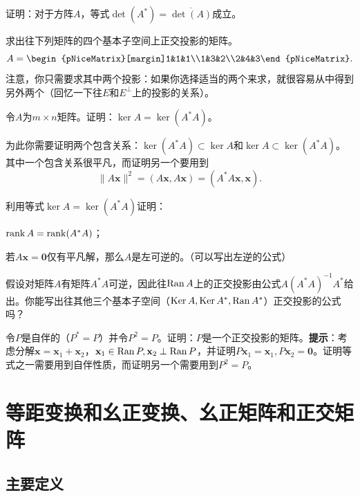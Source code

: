 \begin{problemset}
    \item \label{ex:5_5_1}证明：对于方阵$A$，等式$\det(A^*)=\overline{\det (A)}$成立。
    \item 求出往下列矩阵的四个基本子空间上正交投影的矩阵。
    \[A=\begin{pNiceMatrix}[margin]1&1&1\\1&3&2\\2&4&3\end{pNiceMatrix}.\]
    注意，你只需要求其中两个投影：如果你选择适当的两个来求，就很容易从中得到另外两个（回忆一下往$E$和$E^\perp$上的投影的关系）。
    \item 令$A$为$m\times n$矩阵。证明：$\ker A=\ker (A^*A)$。
    
    为此你需要证明两个包含关系：$\ker (A^*A)\subset \ker A$和$\ker A\subset \ker (A^*A)$。其中一个包含关系很平凡，而证明另一个要用到\[\|A\mathbf{x}\|^2=(A\mathbf{x},A\mathbf{x})=(A^*A\mathbf{x},\mathbf{x}).\]
    \item 利用等式$\ker A=\ker (A^*A)$证明：
    \begin{probenumerate}
        \item $\operatorname{rank} A=\operatorname{rank} (A^*A)$；
        \item 若$A\mathbf{x}=\mathbf{0}$仅有平凡解，那么$A$是左可逆的。（可以写出左逆的公式）
    \end{probenumerate}
    \item 假设对矩阵$A$有矩阵$A^*A$可逆，因此往$\operatorname{Ran} A$上的正交投影由公式\linebreak $A(A^*A)^{-1}A^*$给出。你能写出往其他三个基本子空间（$\operatorname{Ker} A,\operatorname{Ker} A^*,\operatorname{Ran} A^*$）正交投影的公式吗？
    \item \label{ex:5_5_6}令$P$是自伴的（$P^*=P$）并令$P^2=P$。证明：$P$是一个正交投影的矩阵。{\bf 提示}：考虑分解$\mathbf{x}=\mathbf{x}_1+\mathbf{x}_2$，$\mathbf{x}_1\in\operatorname{Ran} P,\mathbf{x}_2\perp\operatorname{Ran} P$，并证明$P\mathbf{x}_1=\mathbf{x}_1,P\mathbf{x}_2=\mathbf{0}$。证明等式之一需要用到自伴性质，而证明另一个需要用到$P^2=P$。
\end{problemset}

\section{等距变换和幺正变换、幺正矩阵和正交矩阵}

\subsection{主要定义}

